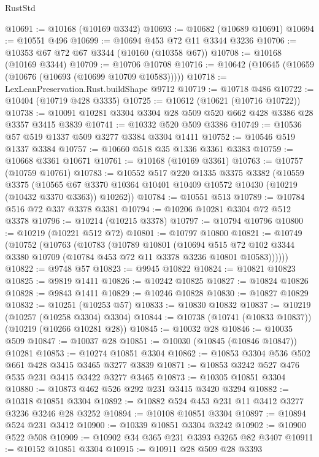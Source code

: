 \begin{lexlean}{RustStd}
\begin{coremodule}
@10691 := @10168 (@10169 @3342)
@10693 := @10682 (@10689 @10691)
@10694 := @10551 @496
@10699 := @10694 @453 @72 @11 @3344 @3236
@10706 := @10353 @67 @72 @67 @3344 (@10160 (@10358 @67))
@10708 := @10168 (@10169 @3344)
@10709 := @10706 @10708
@10716 := @10642 (@10645 (@10659 (@10676 (@10693 (@10699 @10709 @10583)))))
@10718 := LexLeanPreservation.Rust.buildShape @9712
@10719 := @10718 @486
@10722 := @10404 (@10719 @428 @3335)
@10725 := @10612 (@10621 (@10716 @10722))
@10738 := @10091 @10281 @3304 @3304 @28 @509 @520 @662 @428 @3386 @28 @3357 @3415 @3839
@10741 := @10332 @520 @509 @3386
@10749 := @10536 @57 @519 @1337 @509 @3277 @3384 @3304 @1411
@10752 := @10546 @519 @1337 @3384
@10757 := @10660 @518 @35 @1336 @3361 @3383
@10759 := @10668 @3361 @10671
@10761 := @10168 (@10169 @3361)
@10763 := @10757 (@10759 @10761)
@10783 := @10552
    @517
    @220
    @1335
    @3375
    @3382
    (@10559
      @3375
      (@10565 @67 @3370 @10364 @10401 @10409 @10572 @10430 (@10219 (@10432 @3370 @3363)) @10262))
@10784 := @10551 @513
@10789 := @10784 @516 @72 @337 @3378 @3381
@10794 := @10206 @10281 @3304 @72 @512 @3378
@10796 := @10214 (@10215 @3378)
@10797 := @10794 @10796
@10800 := @10219 (@10221 @512 @72)
@10801 := @10797 @10800
@10821 := @10749
    (@10752
      (@10763
        (@10783
          (@10789
            @10801
            (@10694
              @515
              @72
              @102
              @3344
              @3380
              @10709
              (@10784 @453 @72 @11 @3378 @3236 @10801 @10583))))))
@10822 := @9748 @57
@10823 := @9945 @10822
@10824 := @10821 @10823
@10825 := @9819 @1411
@10826 := @10242 @10825
@10827 := @10824 @10826
@10828 := @9843 @1411
@10829 := @10246 @10828
@10830 := @10827 @10829
@10832 := @10251 (@10253 @57)
@10833 := @10830 @10832
@10837 := @10219 (@10257 (@10258 @3304) @3304)
@10844 := @10738 (@10741 (@10833 @10837)) (@10219 (@10266 @10281 @28))
@10845 := @10032 @28
@10846 := @10035 @509
@10847 := @10037 @28
@10851 := @10030 (@10845 (@10846 @10847)) @10281
@10853 := @10274 @10851 @3304
@10862 := @10853 @3304 @536 @502 @661 @428 @3415 @3465 @3277 @3839
@10871 := @10853 @3242 @527 @476 @535 @231 @3415 @3422 @3277 @3465
@10873 := @10305 @10851 @3304
@10880 := @10873 @462 @526 @292 @231 @3415 @3420 @3294
@10882 := @10318 @10851 @3304
@10892 := @10882 @524 @453 @231 @11 @3412 @3277 @3236 @3246 @28 @3252
@10894 := @10108 @10851 @3304
@10897 := @10894 @524 @231 @3412
@10900 := @10339 @10851 @3304 @3242
@10902 := @10900 @522 @508
@10909 := @10902 @34 @365 @231 @3393 @3265 @82 @3407
@10911 := @10152 @10851 @3304
@10915 := @10911 @28 @509 @28 @3393

\end{coremodule}
\end{lexlean}
